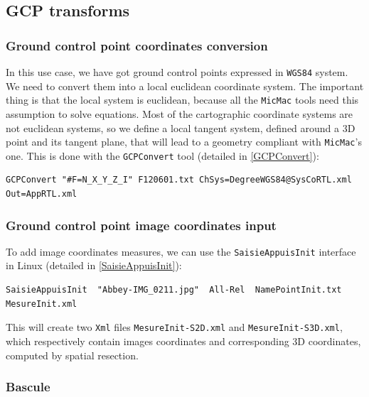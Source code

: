 
\subsection{GCP transforms}


\subsubsection{Ground control point coordinates conversion}

In this use case, we have got ground control points expressed in {\tt WGS84} system. We need to convert them into a local euclidean coordinate system. The important thing is that the local system is euclidean, because all the {\tt MicMac} tools
need this assumption to solve equations. Most of the cartographic coordinate systems are not euclidean systems, so we define a local tangent system, defined around a 3D point and its tangent plane, that will lead to a geometry compliant with {\tt MicMac}'s one.
This is done with the {\tt GCPConvert} tool (detailed in \ref{GCPConvert}):

\begin{verbatim}
GCPConvert "#F=N_X_Y_Z_I" F120601.txt ChSys=DegreeWGS84@SysCoRTL.xml Out=AppRTL.xml
\end{verbatim}

\subsubsection{Ground control point image coordinates input}

To add image coordinates measures, we can use the {\tt SaisieAppuisInit} interface in Linux (detailed in \ref{SaisieAppuisInit}):

\begin{verbatim}
SaisieAppuisInit  "Abbey-IMG_0211.jpg"  All-Rel  NamePointInit.txt  MesureInit.xml
\end{verbatim}

This will create two {\tt Xml} files {\tt MesureInit-S2D.xml} and {\tt MesureInit-S3D.xml}, which respectively contain images coordinates and corresponding 3D coordinates, computed by spatial resection.

\subsubsection{Bascule}


